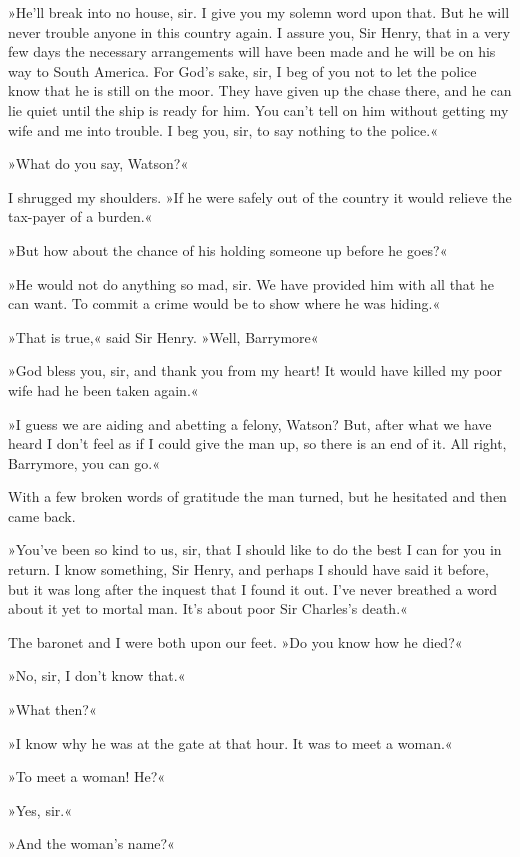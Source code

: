 »He'll break into no house, sir. I give you my solemn word upon that. But he will never trouble anyone in this country again. I assure you, Sir Henry, that in a very few days the necessary arrangements will have been made and he will be on his way to South America. For God's sake, sir, I beg of you not to let the police know that he is still on the moor. They have given up the chase there, and he can lie quiet until the ship is ready for him. You can't tell on him without getting my wife and me into trouble. I beg you, sir, to say nothing to the police.«



»What do you say, Watson?«

I shrugged my shoulders. »If he were safely out of the country it would relieve the tax-payer of a burden.«

»But how about the chance of his holding someone up before he goes?«

»He would not do anything so mad, sir. We have provided him with all that he can want. To commit a crime would be to show where he was hiding.«

»That is true,« said Sir Henry. »Well, Barrymore\longdash«

»God bless you, sir, and thank you from my heart! It would have killed my poor wife had he been taken again.«

»I guess we are aiding and abetting a felony, Watson? But, after what we have heard I don't feel as if I could give the man up, so there is an end of it. All right, Barrymore, you can go.«

With a few broken words of gratitude the man turned, but he hesitated and then came back.

»You've been so kind to us, sir, that I should like to do the best I can for you in return. I know something, Sir Henry, and perhaps I should have said it before, but it was long after the inquest that I found it out. I've never breathed a word about it yet to mortal man. It's about poor Sir Charles's death.«

The baronet and I were both upon our feet. »Do you know how he died?«

»No, sir, I don't know that.«

»What then?«

»I know why he was at the gate at that hour. It was to meet a woman.«

»To meet a woman! He?«

»Yes, sir.«

»And the woman's name?«

